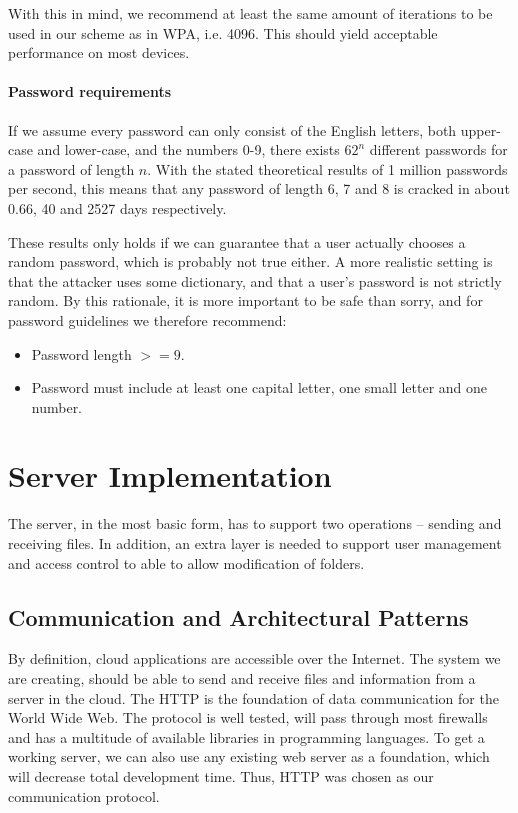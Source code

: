 \documentclass[pdftex,english,10pt,b5paper,twoside]{book}
\begin{document}

With this in mind, we recommend at least the same amount of iterations to be
used in our scheme as in \ac{WPA}, i.e. 4096. This should yield acceptable
performance on most devices. 

\paragraph{Password requirements}

If we assume every password can only consist of the English letters, both
upper-case and lower-case, and the numbers 0-9, there exists $62^n$ different
passwords for a password of length $n$. With the stated theoretical results of
1 million passwords per second, this means that any password of length 6, 7 and
8 is cracked in about 0.66, 40 and 2527 days respectively.

These results only holds if we can guarantee that a user actually chooses
a random password, which is probably not true either. A more realistic setting
is that the attacker uses some dictionary, and that a user's password is not
strictly random. By this rationale, it is more important to be safe than sorry,
and for password guidelines we therefore recommend:
\begin{itemize}
\item Password length $>= 9$.
\item Password must include at least one capital letter, one small letter and
one number.
\end{itemize}

\section{Server Implementation}

The server, in the most basic form, has to support two operations -- sending
and receiving files. In addition, an extra layer is needed to support user
management and access control to able to allow modification of folders.

\subsection{Communication and Architectural Patterns}

By definition, cloud applications are accessible over the Internet. The system
we are creating, should be able to send and receive files and information from
a server in the cloud. The \acf{HTTP} is the foundation of data communication
for the World Wide Web. The protocol is well tested, will pass through most
firewalls and has a multitude of available libraries in programming languages.
To get a working server, we can also use any existing web server as a
foundation, which will decrease total development time. Thus, \ac{HTTP} was
chosen as our communication protocol.
\end{document}
